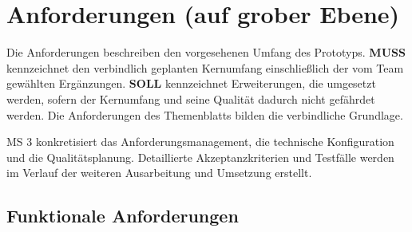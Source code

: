 \documentclass[11pt,a4paper]{article}
\begin{document}
\section{Anforderungen (auf grober Ebene)}

Die Anforderungen beschreiben den vorgesehenen Umfang des Prototyps. \textbf{MUSS} kennzeichnet den verbindlich geplanten Kernumfang einschließlich der vom Team gewählten Ergänzungen. \textbf{SOLL} kennzeichnet Erweiterungen, die umgesetzt werden, sofern der Kernumfang und seine Qualität dadurch nicht gefährdet werden. Die Anforderungen des Themenblatts bilden die verbindliche Grundlage.

MS 3 konkretisiert das Anforderungsmanagement, die technische Konfiguration und die Qualitätsplanung. Detaillierte Akzeptanzkriterien und Testfälle werden im Verlauf der weiteren Ausarbeitung und Umsetzung erstellt.

\newpage
\subsection{Funktionale Anforderungen}
\end{document}
